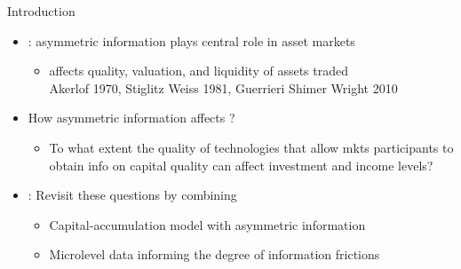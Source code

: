 \documentclass[english,xcolor=svgnames,aspectratio=169]{beamer}
\begin{document}
\begin{frame}{Introduction}

\begin{itemize}
\item {\color{dblue}{Economic theories}}: asymmetric information plays central role in asset markets \smallskip
\begin{itemize}
\item affects quality, valuation, and liquidity of assets traded \\ \smallskip
 {\scriptsize{Akerlof 1970, Stiglitz Weiss 1981, Guerrieri Shimer Wright 2010}} \bigskip
\end{itemize} 


\item How asymmetric information affects {\color{dred}{capital accumulation}}? \smallskip
\begin{itemize}
\item To what extent the quality of technologies that allow mkts participants to obtain info on capital quality can affect investment and income levels?
\end{itemize} 
\bigskip

\item {\color{dblue}{This paper}}:  Revisit these questions by combining \smallskip
\begin{itemize}
\item Capital-accumulation model with asymmetric information  \smallskip
\item Microlevel data informing the degree of information frictions

\end{itemize}

\end{itemize}

\end{frame}





\end{document}

